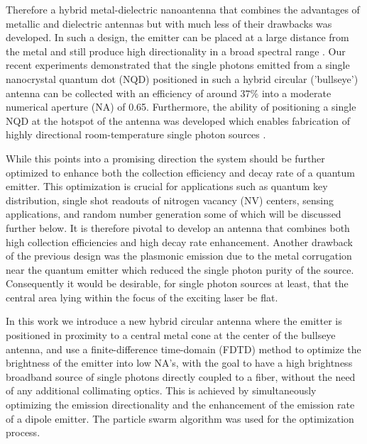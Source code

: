 \documentclass[10pt,onecolumn ]{article}
\begin{document}
Therefore a hybrid metal-dielectric nanoantenna that combines the advantages of metallic and dielectric antennas but with much less of their drawbacks was developed. In such a design, the emitter can be placed at a large distance from the metal and still produce high directionality in a broad spectral range \cite{Livneh2015EfficientNanoantenna,Livneh2016}. 
Our recent experiments demonstrated that the single photons emitted from a single nanocrystal quantum dot (NQD) positioned in such a hybrid circular ('bullseye') antenna can be collected with an efficiency of around $37 \%$ into a moderate numerical aperture (NA) of 0.65. Furthermore, the ability of positioning a single NQD at the hotspot of the antenna was developed which enables fabrication of highly directional room-temperature single photon sources \cite{Livneh2016,Harats2017DesignEmission}.

While this points into a promising direction the system should be further optimized to enhance both the collection efficiency and decay rate of a quantum emitter.
This optimization is crucial for applications such as quantum key distribution, single shot readouts of nitrogen vacancy (NV) centers, sensing applications, and random number generation \cite{Rarity1994QuantumSharing,Lounis2005,Wolf2015Purcell-enhancedDiamond,Aharonovich2016Solid-stateEmitters} some of which will be discussed further below.
It is therefore pivotal to develop an antenna that combines both high collection efficiencies and high decay rate enhancement. 
Another drawback of the previous design was the plasmonic emission due to the metal corrugation near the quantum emitter which reduced the single photon purity of the source. \cite{Livneh2016}
Consequently it would be desirable, for single photon sources at least, that the central area lying within the focus of the exciting laser be flat. 

In this work we introduce a new hybrid circular antenna where the emitter is positioned in proximity to a central metal cone at the center of the bullseye antenna, and use a finite-difference time-domain (FDTD) method \cite{Taflove2005ComputationalMethod,LumericalInc.} to optimize the brightness of the emitter into low NA's, with the goal to have a high brightness broadband source of single photons directly coupled to a fiber, without the need of any additional collimating optics. This is achieved by simultaneously optimizing the emission directionality and the enhancement of the emission rate of a dipole emitter. The particle swarm algorithm \cite{Robinson2004ParticleElectromagnetics} was used for the optimization process.  
\end{document}
